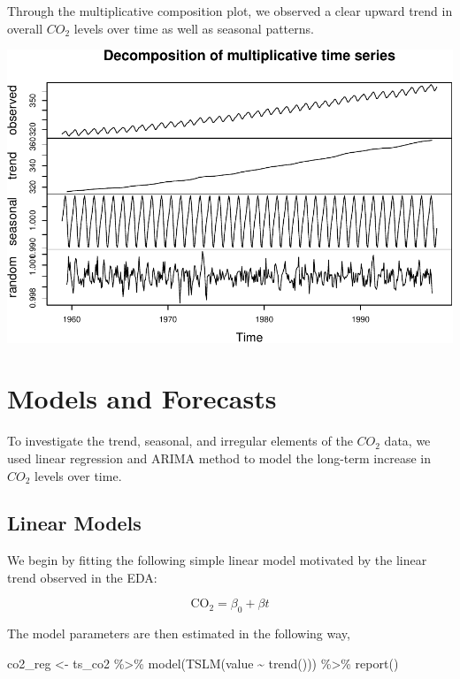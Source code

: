 \documentclass[AER]{AEA}
\newenvironment{Shaded}{\begin{snugshade}}{\end{snugshade}}
\newcommand{\FunctionTok}[1]{\textcolor[rgb]{0.00,0.00,0.00}{#1}}
\newcommand{\NormalTok}[1]{#1}
\newcommand{\OtherTok}[1]{\textcolor[rgb]{0.56,0.35,0.01}{#1}}
\newcommand{\SpecialCharTok}[1]{\textcolor[rgb]{0.00,0.00,0.00}{#1}}
\begin{document}
Through the multiplicative composition plot, we observed a clear upward
trend in overall \(CO_2\) levels over time as well as seasonal patterns.

\includegraphics{co2_1997_Qian_files/figure-latex/decompose plot-1.pdf}

\hypertarget{models-and-forecasts}{%
\section{Models and Forecasts}\label{models-and-forecasts}}

To investigate the trend, seasonal, and irregular elements of the
\(CO_2\) data, we used linear regression and ARIMA method to model the
long-term increase in \(CO_2\) levels over time.

\hypertarget{linear-models}{%
\subsection{Linear Models}\label{linear-models}}

We begin by fitting the following simple linear model motivated by the
linear trend observed in the EDA:

\begin{equation}
\label{eq:one}
\text{CO}_{2} = \beta_0 + \beta t
\end{equation}

The model parameters are then estimated in the following way,

\begin{Shaded}
\begin{Highlighting}[]
\NormalTok{co2\_reg }\OtherTok{\textless{}{-}}\NormalTok{ ts\_co2 }\SpecialCharTok{\%\textgreater{}\%} 
    \FunctionTok{model}\NormalTok{(}\FunctionTok{TSLM}\NormalTok{(value }\SpecialCharTok{\textasciitilde{}} \FunctionTok{trend}\NormalTok{())) }\SpecialCharTok{\%\textgreater{}\%}
  \FunctionTok{report}\NormalTok{()}
\end{Highlighting}
\end{Shaded}
\end{document}
